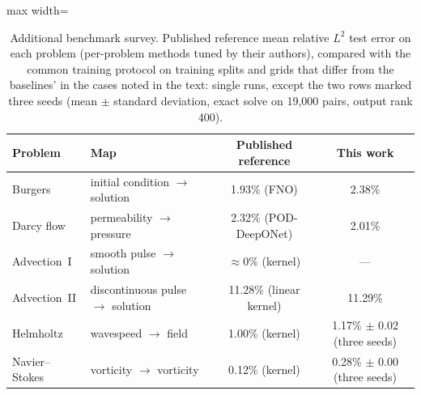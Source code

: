 \begin{table}[t]
\centering
\caption{Additional benchmark survey. Published
reference mean relative $L^2$ test error on each problem (per-problem
methods tuned by their authors), compared with the common training protocol on
training splits and grids that differ from the baselines' in the cases noted
in the text: single runs, except the two rows marked three seeds (mean
$\pm$ standard deviation, exact solve on 19{,}000 pairs, output rank 400).}
\label{tab:suite}
\begin{adjustbox}{max width=\linewidth}
\begin{tabular}{llcc}
\toprule
Problem & Map & Published reference & This work \\
\midrule
Burgers & initial condition $\to$ solution & 1.93\% (FNO) & 2.38\% \\
Darcy flow & permeability $\to$ pressure & 2.32\% (POD-DeepONet) & 2.01\% \\
Advection~I & smooth pulse $\to$ solution & $\approx0\%$ (kernel) & --- \\
Advection~II & discontinuous pulse $\to$ solution & 11.28\% (linear kernel) & 11.29\% \\
Helmholtz & wavespeed $\to$ field & 1.00\% (kernel) & 1.17\% $\pm$ 0.02 (three seeds) \\
Navier--Stokes & vorticity $\to$ vorticity & 0.12\% (kernel) & 0.28\% $\pm$ 0.00 (three seeds) \\
\bottomrule
\end{tabular}
\end{adjustbox}
\end{table}


